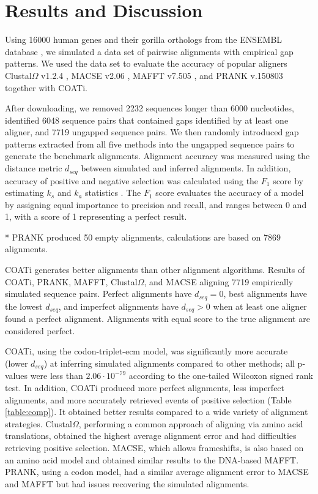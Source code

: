 \section*{Results and Discussion}
Using 16000 human genes and their gorilla orthologs from the ENSEMBL
database , we simulated a data set of pairwise
alignments with empirical gap patterns.
We used the data set to evaluate the accuracy of popular aligners
Clustal$\Omega$ v1.2.4 ,
MACSE v2.06 , MAFFT v7.505
, and PRANK v.150803 
together with COATi.

After downloading, we removed 2232 sequences longer than 6000 nucleotides, identified 6048 sequence pairs that contained gaps identified by at least one aligner, and 7719 ungapped sequence pairs.
We then randomly introduced gap patterns extracted from all five methods into the ungapped sequence pairs to generate the benchmark alignments.
Alignment accuracy was measured using the distance metric $d_{seq}$
 between simulated and inferred
alignments.
In addition, accuracy of positive and negative selection was calculated
using the $F_1$ score by estimating $k_s$ and $k_a$ statistics
.
The $F_1$ score evaluates the accuracy of a model by assigning equal importance to precision and recall, and ranges between 0 and 1, with a score of 1 representing a perfect result.

\begin{table}[!ht]
\centering

 \vspace{1mm}
 \footnotesize{* PRANK produced 50 empty alignments, calculations are based on 7869 alignments.}
 \caption{COATi generates better alignments than other alignment algorithms. Results of COATi, PRANK, MAFFT, Clustal$\Omega$, and MACSE aligning 7719 empirically simulated sequence pairs. Perfect alignments have $d_{seq}=0$, best alignments have the lowest $d_{seq}$, and imperfect alignments have $d_{seq}>0$ when at least one aligner found a perfect alignment. Alignments with equal score to the true alignment are considered perfect.}
 \label{table:comp}
\end{table}

COATi, using the codon-triplet-ecm model, was significantly more accurate (lower $d_{seq}$) at inferring simulated alignments compared to other methods; all p-values were less than $2.06 \cdot 10^{-79}$ according to the one-tailed Wilcoxon signed rank test.
In addition, COATi produced more perfect alignments, less imperfect alignments, and more accurately retrieved events of positive selection (Table \ref{table:comp}).
It obtained better results compared to a wide variety of alignment strategies.
Clustal$\Omega$, performing a common approach of aligning via amino acid translations, obtained the highest average alignment error and had difficulties retrieving positive selection.
MACSE, which allows frameshifts, is also based on an amino acid model and obtained similar results to the DNA-based MAFFT.
PRANK, using a codon model, had a similar average alignment error to MACSE and MAFFT but had issues recovering the simulated alignments.

